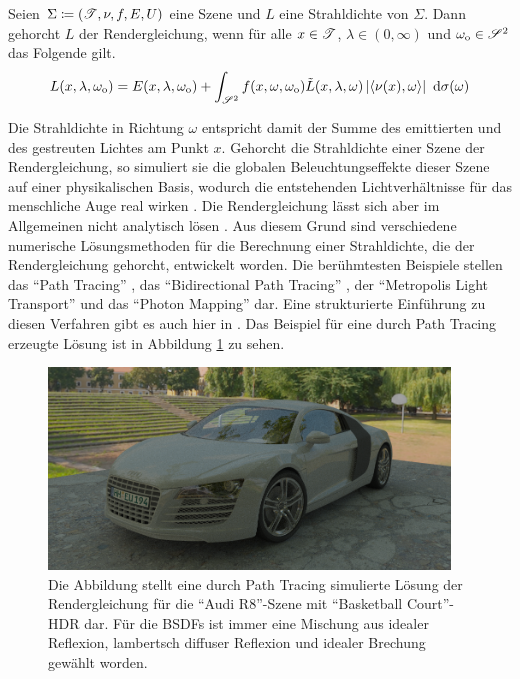 		\begin{definition}[Rendergleichung]
			Seien $\Sigma\coloneqq (\mathscr{T},\nu,f,E,U)$ eine Szene und $L$ eine Strahldichte von $\Sigma$.
			Dann gehorcht $L$ der Rendergleichung, wenn für alle $x\in\mathscr{T}$, $\lambda\in(0,\infty)$ und $\omega_{\mathrm{o}}\in\mathscr{S}^{2}$ das Folgende gilt.
			\[
				L(x,\lambda,\omega_{\mathrm{o}}) = E(x,\lambda,\omega_{\mathrm{o}}) + \int_{\mathscr{S}^{2}}^{}  f(x,\omega,\omega_{\mathrm{o}})\tilde{L}(x,\lambda,\omega) \left\vert \left\langle \nu(x),\omega \right\rangle \right\vert \ \mathrm{d} \sigma(\omega)
			\]
		\end{definition}

		Die Strahldichte in Richtung $\omega$ entspricht damit der Summe des emittierten und des gestreuten Lichtes am Punkt $x$.
		Gehorcht die Strahldichte einer Szene der Rendergleichung, so simuliert sie die globalen Beleuchtungseffekte dieser Szene auf einer physikalischen Basis, wodurch die entstehenden Lichtverhältnisse für das menschliche Auge real wirken \cite{kajiya-lte,pbrt3,veach-thesis}.
		Die Rendergleichung lässt sich aber im Allgemeinen nicht analytisch lösen \cite{pbrt3,veach-thesis,kajiya-lte}.
		Aus diesem Grund sind verschiedene numerische Lösungsmethoden für die Berechnung einer Strahldichte, die der Rendergleichung gehorcht, entwickelt worden.
		Die berühmtesten Beispiele stellen das \enquote{Path Tracing} \cite{kajiya-lte}, das \enquote{Bidirectional Path Tracing} \cite{bidirectional-path-tracing}, der \enquote{Metropolis Light Transport} \cite{veach-mlt} und das \enquote{Photon Mapping} \cite{course-photon-map} dar.
		Eine strukturierte Einführung zu diesen Verfahren gibt es auch hier in \cite{pbrt3}.
		Das Beispiel für eine durch Path Tracing erzeugte Lösung ist in Abbildung \ref{fig:example-audi-r8-pt} zu sehen.

		\begin{figure}
			\center
			\includegraphics[width=0.95\textwidth]{pic/example-audi_r8-pt.png}
			\caption[Path Tracing am Beispiel der \enquote{Audi R8}-Szene mit \enquote{Basketball Court}-HDR]{Die Abbildung stellt eine durch Path Tracing simulierte Lösung der Rendergleichung für die \enquote{Audi R8}-Szene mit \enquote{Basketball Court}-HDR dar. Für die BSDFs ist immer eine Mischung aus idealer Reflexion, lambertsch diffuser Reflexion und idealer Brechung gewählt worden.}
			\label{fig:example-audi-r8-pt}
		\end{figure}


